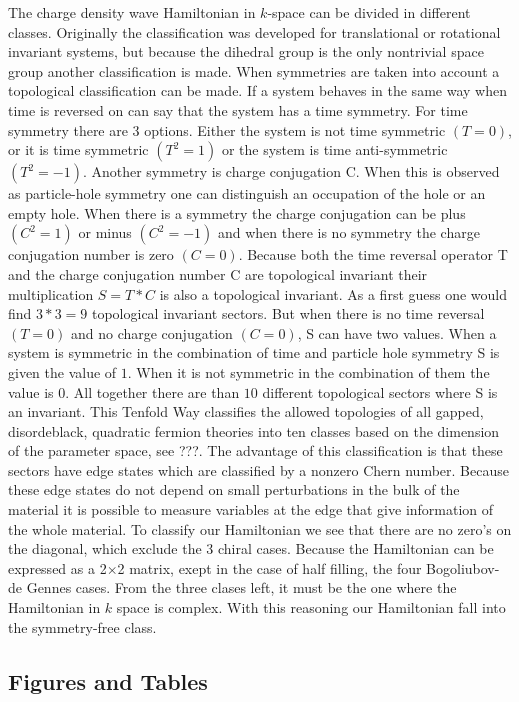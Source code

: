 \documentclass[letterpaper, 10 pt, conference]{ieeeconf}  %
\begin{document}
The charge density wave Hamiltonian in $k$-space can be divided in different
classes. Originally the classification was developed for translational or
rotational invariant systems, but because the dihedral group is the only
nontrivial space group another classification is made. When symmetries are taken
into account a topological classification can be made. If a system behaves in
the same way when time is reversed on can say that the system has a time
symmetry. For time symmetry there are 3 options. Either the system is not time
symmetric $(T=0)$, or it is time symmetric $(T^2=1)$ or the system is time
anti-symmetric  $(T^2=-1)$.  Another symmetry  is charge conjugation C. When
this is observed as particle-hole symmetry one can distinguish an occupation of
the hole or an empty hole. When there is a symmetry the  charge conjugation can
be plus $(C^2=1)$ or minus $(C^2=-1)$ and when there is no symmetry  the charge
conjugation number  is zero $(C=0)$.  Because both the time reversal operator T
and the charge conjugation number C are topological invariant their
multiplication $S=T * C $ is also a topological invariant. As a first guess one
would find $3 * 3 = 9 $ topological invariant sectors. But when there is no time
reversal $(T=0)$ and no charge conjugation $(C=0)$, S can have two values. When
a system is symmetric in the combination of time and particle hole symmetry S is
given the value of $1$. When it is not symmetric in the combination of them the
value is $0$. All together there are than $10$ different topological sectors
where S is an invariant. This Tenfold Way classifies the allowed topologies of
all gapped, disordeblack, quadratic fermion theories into ten classes based on the
dimension of the parameter space, see ???. The advantage of this classification is that
these sectors have edge states which are classified by a nonzero Chern number.
Because these edge states do not
depend on small perturbations in the bulk of the material it is possible to
measure variables at the edge that give information of the whole material.
To classify our Hamiltonian we see that there are no zero's on the diagonal,
which exclude the 3 chiral cases. Because the Hamiltonian can be expressed as a 2$\times$2
 matrix, exept in the case of half filling, the four Bogoliubov-de Gennes cases. From the three
 clases left, it must be the one where the Hamiltonian in $k$ space is complex.
 With this reasoning our Hamiltonian fall into the symmetry-free class.


\subsection{Figures and Tables}
\end{document}
